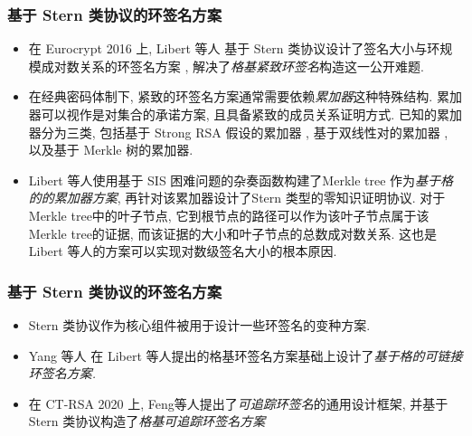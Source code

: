 \documentclass{beamer}
\begin{document}
\begin{frame}
    \frametitle{基于 Stern 类协议的环签名方案}
    \begin{itemize}
        \item 在 Eurocrypt 2016 上, Libert 等人 基于 Stern 类协议设计了签名大小与环规模成对数关系的环签名方案 , 解决了\emph{格基紧致环签名}构造这一公开难题. 
        \item 在经典密码体制下, 紧致的环签名方案通常需要依赖\emph{累加器}这种特殊结构. 累加器可以视作是对集合的承诺方案, 且具备紧致的成员关系证明方式. 已知的累加器分为三类, 包括基于 Strong RSA 假设的累加器 , 基于双线性对的累加器 , 以及基于 Merkle 树的累加器. 
        \item Libert 等人使用基于 SIS 困难问题的杂奏函数构建了Merkle tree 作为\emph{基于格的的累加器方案}, 再针对该累加器设计了Stern 类型的零知识证明协议. 对于Merkle tree中的叶子节点, 它到根节点的路径可以作为该叶子节点属于该Merkle tree的证据, 而该证据的大小和叶子节点的总数成对数关系. 这也是 Libert 等人的方案可以实现对数级签名大小的根本原因.
    \end{itemize}

    

\end{frame}

\begin{frame}
    \frametitle{基于 Stern 类协议的环签名方案}

    \begin{itemize}
        \item Stern 类协议作为核心组件被用于设计一些环签名的变种方案. 
        \item Yang 等人 在 Libert 等人提出的格基环签名方案基础上设计了\emph{基于格的可链接环签名方案.} 
        \item 在 CT-RSA 2020 上, Feng等人提出了\emph{可追踪环签名}的通用设计框架, 并基于 Stern 类协议构造了\emph{格基可追踪环签名方案}
    \end{itemize}

\end{frame}
\end{document}

